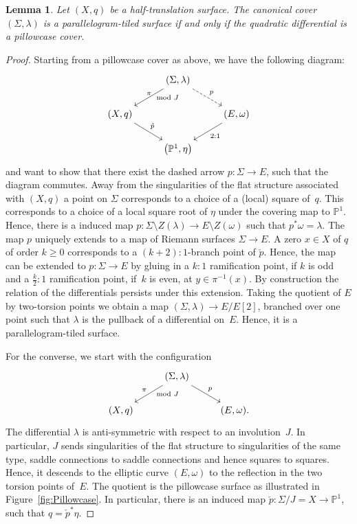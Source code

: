 \documentclass[10pt,a4paper]{amsart}
\numberwithin{equation}{section}
\newtheorem{lemm}[theo]{Lemma}
\theoremstyle{definition}
\renewcommand{\to}{\rightarrow}
\newcommand{\PP}{\mathbb{P}}
\begin{document}
\begin{lemm}\label{lemm:pillow} Let $(X,q)$ be a half-trans\-lation surface. The canonical cover $(\Sigma,\lambda)$ is a para\-llelo\-gram-tiled surface if and only if the quadratic differential is a pillowcase cover.
\end{lemm}
\begin{proof}
 Starting from a pillowcase cover as above, we have the following diagram:
\[	\begin{tikzcd}
		& (\Sigma,\lambda) \ar[rd,"p",dashed] \ar[ld,"\pi" above, "\mod J" right]& \\ (X,q) \ar[rd,"\check{p}"] & & (E, \omega) \ar[ld,"2:1"] \\ & \bigl(\PP^1,\eta\bigr) &
\end{tikzcd}
\]
and want to show that there exist the dashed arrow $p\colon \Sigma \to E$, such that the diagram commutes. Away from the singularities of the flat structure associated with $(X,q)$ a point on $\Sigma$ corresponds to a choice of a (local) square of~$q$. This corresponds to a choice of a local square root of $\eta$ under the covering map to $\PP^1$. Hence, there is a induced map $p\colon \Sigma\setminus Z(\lambda) \to E \setminus Z(\omega)$ such that $p^*\omega=\lambda$.
The map $p$ uniquely extends to a map of Riemann surfaces $\Sigma \to E$. A zero $x \in X$ of $q$ of order $k\geq 0$ corresponds to a $(k+2):1$-branch point of $\check{p}$. Hence, the map can be extended to $p\colon \Sigma \to E$ by gluing in a $k:1$ ramification point, if $k$ is odd and a $\frac{k}{2}:1$ ramification point, if~$k$ is even, at $y \in \pi^{-1}(x)$.
 By construction the relation of the differentials persists under this extension. Taking the quotient of $E$ by two-torsion points we obtain a map $(\Sigma,\lambda) \to E/E[2]$, branched over one point such that $\lambda$ is the pullback of a differential on~$E$. Hence, it is a parallelogram-tiled surface.

For the converse, we start with the configuration
\[ 	\begin{tikzcd}
		& (\Sigma,\lambda) \ar[rd,"p"] \ar[ld,"\pi" above left, "\mod J" right]& \\ (X,q) & & (E, \omega).
	\end{tikzcd}
\]
The differential $\lambda$ is anti-symmetric with respect to an involution~$J$. In particular, $J$ sends singularities of the flat structure to singularities of the same type, saddle connections to saddle connections and hence squares to squares. Hence, it descends to the elliptic curve $(E,\omega)$ to the reflection in the two torsion points of~$E$. The quotient is the pillowcase surface as illustrated in Figure~\ref{fig:Pillowcase}. In particular, there is an induced map $\check{p}\colon \Sigma/J=X \to \PP^1$, such that $q=\check{p}^*\eta$.
\end{proof}
\end{document}

